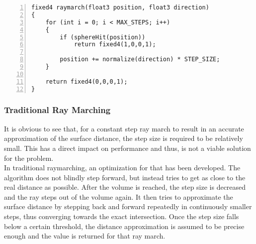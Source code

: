 \begin{lstlisting}[language=HLSL, numbers=left, caption=Ray march function with constant step.,captionpos=b, label=lst:shader:raymarch:spherehit]
fixed4 raymarch(float3 position, float3 direction)
{
    for (int i = 0; i < MAX_STEPS; i++)
    {
        if (sphereHit(position))
            return fixed4(1,0,0,1);
        
        position += normalize(direction) * STEP_SIZE;
    }
    
    return fixed4(0,0,0,1);
}
\end{lstlisting}


\subsubsection{Traditional Ray Marching}
It is obvious to see that, for a constant step ray march to result in an accurate approximation of the surface distance, the step size is required to be relatively small.
This has a direct impact on performance and thus, is not a viable solution for the problem.
\\
In traditional \gls{raymarching}, an optimization for that has been developed. The algorithm does not blindly step forward, but instead tries to get as close to the real distance as possible.
After the volume is reached, the step size is decreased and the ray steps out of the volume again. It then tries to approximate the surface distance by stepping back and forward repeatedly in continuously smaller steps, thus converging towards the exact intersection.
Once the step size falls below a certain threshold, the distance approximation is assumed to be precise enough and the value is returned for that ray march.


